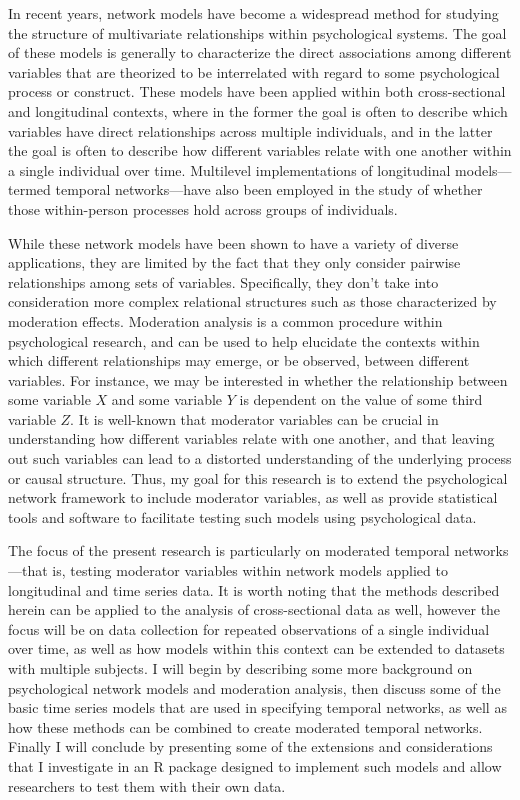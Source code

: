 In recent years, network models have become a widespread method for studying the structure of multivariate relationships within psychological systems. The goal of these models is generally to characterize the direct associations among different variables that are theorized to be interrelated with regard to some psychological process or construct. These models have been applied within both cross-sectional and longitudinal contexts, where in the former the goal is often to describe which variables have direct relationships across multiple individuals, and in the latter the goal is often to describe how different variables relate with one another within a single individual over time. Multilevel implementations of longitudinal models—termed temporal networks—have also been employed in the study of whether those within-person processes hold across groups of individuals.

While these network models have been shown to have a variety of diverse applications, they are limited by the fact that they only consider pairwise relationships among sets of variables. Specifically, they don’t take into consideration more complex relational structures such as those characterized by moderation effects. Moderation analysis is a common procedure within psychological research, and can be used to help elucidate the contexts within which different relationships may emerge, or be observed, between different variables. For instance, we may be interested in whether the relationship between some variable $X$ and some variable $Y$ is dependent on the value of some third variable $Z$. It is well-known that moderator variables can be crucial in understanding how different variables relate with one another, and that leaving out such variables can lead to a distorted understanding of the underlying process or causal structure. Thus, my goal for this research is to extend the psychological network framework to include moderator variables, as well as provide statistical tools and software to facilitate testing such models using psychological data. 

The focus of the present research is particularly on moderated temporal networks—that is, testing moderator variables within network models applied to longitudinal and time series data. It is worth noting that the methods described herein can be applied to the analysis of cross-sectional data as well, however the focus will be on data collection for repeated observations of a single individual over time, as well as how models within this context can be extended to datasets with multiple subjects. I will begin by describing some more background on psychological network models and moderation analysis, then discuss some of the basic time series models that are used in specifying temporal networks, as well as how these methods can be combined to create moderated temporal networks. Finally I will conclude by presenting some of the extensions and considerations that I investigate in an R package designed to implement such models and allow researchers to test them with their own data. 

